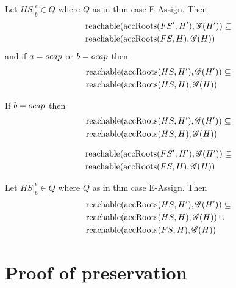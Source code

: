 \begin{proposition}
  Let $HS|_b^e \in Q$ where $Q$ as in thm case {\sc E-Assign}. Then
  \begin{align*}
    &\mbox{$\mathrm{reachable}$}{(\mbox{$\mathrm{accRoots}$}{(FS',H')}, \ensuremath{\mathscr{G}}{(H')})} \subseteq \\
    &\mbox{$\mathrm{reachable}$}{(\mbox{$\mathrm{accRoots}$}{(FS,H)}, \ensuremath{\mathscr{G}}{(H)})}
  \end{align*}
  and if $a = \mbox{$ocap$}$ or $b = \mbox{$ocap$}$ then
  \begin{align*}
    &\mbox{$\mathrm{reachable}$}{(\mbox{$\mathrm{accRoots}$}{(HS,H')}, \ensuremath{\mathscr{G}}{(H')})} \subseteq \\
    &\mbox{$\mathrm{reachable}$}{(\mbox{$\mathrm{accRoots}$}{(HS,H)}, \ensuremath{\mathscr{G}}{(H)})}
  \end{align*}
\end{proposition}

\begin{corollary}
  If $b = \mbox{$ocap$}$ then 
  \begin{align*}
    &\mbox{$\mathrm{reachable}$}{(\mbox{$\mathrm{accRoots}$}{(HS,H')}, \ensuremath{\mathscr{G}}{(H')})} \subseteq \\
    &\mbox{$\mathrm{reachable}$}{(\mbox{$\mathrm{accRoots}$}{(HS,H)}, \ensuremath{\mathscr{G}}{(H)})}
  \end{align*}
\end{corollary}

\begin{corollary}
  \begin{align*}
    &\mbox{$\mathrm{reachable}$}{(\mbox{$\mathrm{accRoots}$}{(FS',H')}, \ensuremath{\mathscr{G}}{(H')})} \subseteq \\
    &\mbox{$\mathrm{reachable}$}{(\mbox{$\mathrm{accRoots}$}{(FS,H)}, \ensuremath{\mathscr{G}}{(H)})}
  \end{align*}
\end{corollary}

\begin{proposition}
  Let $HS|_b^e \in Q$ where $Q$ as in thm case {\sc E-Assign}. Then
  \begin{align*}
    &\mbox{$\mathrm{reachable}$}{(\mbox{$\mathrm{accRoots}$}{(HS,H')}, \ensuremath{\mathscr{G}}{(H')})} \subseteq \\
    &\mbox{$\mathrm{reachable}$}{(\mbox{$\mathrm{accRoots}$}{(HS,H)}, \ensuremath{\mathscr{G}}{(H)})}\: \cup \\ 
    &\mbox{$\mathrm{reachable}$}{(\mbox{$\mathrm{accRoots}$}{(FS,H)}, \ensuremath{\mathscr{G}}{(H)})}
  \end{align*}
\end{proposition}


\section{Proof of preservation}
\label{sec:proof_of_preservation}

